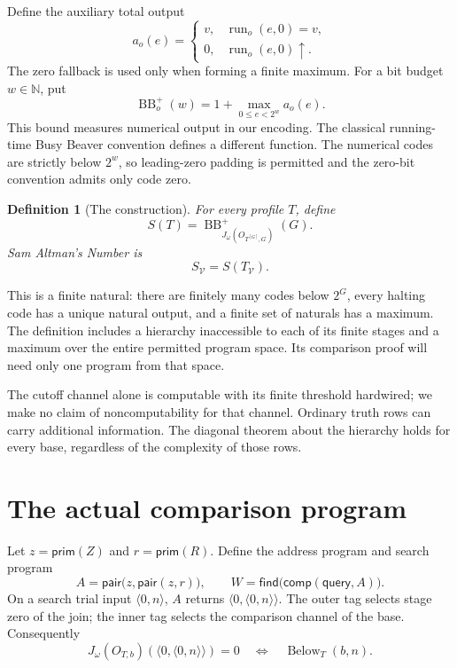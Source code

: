 \documentclass[11pt]{article}
\newtheorem{definition}[theorem]{Definition}
\newcommand{\N}{\mathbb N}
\newcommand{\V}{\mathcal V}
\newcommand{\Below}{\operatorname{Below}}
\newcommand{\run}{\operatorname{run}}
\newcommand{\BB}{\operatorname{BB}^{+}}
\newcommand{\pair}[2]{\langle #1,#2\rangle}
\newcommand{\diverges}{\uparrow}
\begin{document}
Define the auxiliary total output
\[
 a_o(e)=
 \begin{cases}v,&\run_o(e,0)=v,\\0,&\run_o(e,0)\diverges.
 \end{cases}
\]
The zero fallback is used only when forming a finite maximum. For a bit budget
$w\in\N$, put
\begin{equation}\label{eq:bb}
                  \BB_o(w)=1+\max_{0\leq e<2^w}a_o(e).
\end{equation}
This bound measures numerical output in our encoding. The classical
running-time Busy Beaver convention defines a different function.
The numerical codes are strictly below
$2^w$, so leading-zero padding is permitted and the zero-bit convention
admits only code zero.

\begin{definition}[The construction]\label{def:number}
For every profile $T$, define
\[
 S(T)=\BB_{J_\omega(O_{T^{[G]},G})}(G).
\]
Sam Altman's Number is
\[
                          \boxed{S_{\V}=S(T_{\V}).}
\]
\end{definition}

This is a finite natural: there are finitely many codes below $2^G$, every
halting code has a unique natural output, and a finite set of naturals has a
maximum. The definition includes a hierarchy inaccessible to each of its
finite stages and a maximum over the entire permitted program space. Its
comparison proof will need only one program from that space.

The cutoff channel alone is computable with its finite threshold hardwired;
we make no claim of noncomputability for that channel. Ordinary truth rows can
carry additional information. The diagonal theorem about the hierarchy holds
for every base, regardless of the complexity of those rows.

\section{The actual comparison program}\label{sec:witness}

Let $z=\mathsf{prim}(Z)$ and $r=\mathsf{prim}(R)$. Define the address program
and search program
\begin{equation}\label{eq:witness}
 A=\mathsf{pair}\bigl(z,\mathsf{pair}(z,r)\bigr),\qquad
 W=\mathsf{find}\bigl(\mathsf{comp}(\mathsf{query},A)\bigr).
\end{equation}
On a search trial input $\pair0n$, $A$ returns
$\pair0{\pair0n}$. The outer tag selects stage zero of the join; the inner
tag selects the comparison channel of the base. Consequently
\[
 J_\omega(O_{T,b})(\pair0{\pair0n})=0
       \quad\Longleftrightarrow\quad\Below_T(b,n).
\]
\end{document}
